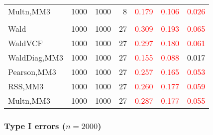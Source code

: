 \documentclass[
]{article}
\begin{document}
\begin{table}[H]
{\begin{tabular}[t]{lrrrrrr}
\hspace{1em}Multn,MM3 & 1000 & 1000 & 8 & \textcolor{red}{0.179} & \textcolor{red}{0.106} & \textcolor{red}{0.026}\\
\addlinespace[0.3em]
\multicolumn{7}{l}{\textbf{3F 15V}}\\
\hspace{1em}Wald & 1000 & 1000 & 27 & \textcolor{red}{0.309} & \textcolor{red}{0.193} & \textcolor{red}{0.065}\\
\hspace{1em}WaldVCF & 1000 & 1000 & 27 & \textcolor{red}{0.297} & \textcolor{red}{0.180} & \textcolor{red}{0.061}\\
\hspace{1em}WaldDiag,MM3 & 1000 & 1000 & 27 & \textcolor{red}{0.155} & \textcolor{red}{0.088} & \textcolor{black}{0.017}\\
\hspace{1em}Pearson,MM3 & 1000 & 1000 & 27 & \textcolor{red}{0.257} & \textcolor{red}{0.165} & \textcolor{red}{0.053}\\
\hspace{1em}RSS,MM3 & 1000 & 1000 & 27 & \textcolor{red}{0.260} & \textcolor{red}{0.177} & \textcolor{red}{0.059}\\
\hspace{1em}Multn,MM3 & 1000 & 1000 & 27 & \textcolor{red}{0.287} & \textcolor{red}{0.177} & \textcolor{red}{0.055}\\
\bottomrule
\end{tabular}}
\endgroup{}
\end{table}

\hypertarget{type-i-errors-n2000-1}{%
\subsubsection{\texorpdfstring{Type I errors
(\(n=2000\))}{Type I errors (n=2000)}}\label{type-i-errors-n2000-1}}
\end{document}
